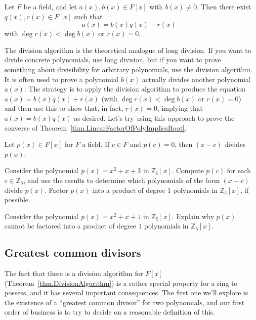 \begin{theorem}\label{thm.DivisionAlgorithm}
Let $F$ be a field, and let $a(x),b(x)\in F[x]$ with $b(x) \neq 0$. Then there exist $q(x),r(x)\in F[x]$ such that 
\[a(x) = b(x)q(x) + r(x)\]
with $\deg r(x) < \deg b(x)$ or $r(x) = 0$.
\end{theorem}

The division algorithm is the theoretical analogue of long division. If you want to divide concrete polynomials, use long division, but if you want to prove something about divisibility for arbitrary polynomials, use the division algorithm. It is often used to prove a polynomial $b(x)$ actually divides another polynomial $a(x)$. The strategy is to apply the division algorithm to produce the equation $a(x) = b(x)q(x) + r(x)$ (with $\deg r(x) < \deg b(x)$ or $r(x) = 0$) and then use this to show that, in fact, $r(x)=0$,  implying that $a(x) = b(x)q(x)$ as desired. Let's try using this approach to prove the converse of Theorem~\ref{thm.LinearFactorOfPolyImpliesRoot}.

\begin{theorem}\label{thm.RootImpliesLinearFactorOfPoly}
Let $p(x)\in F[x]$ for $F$ a field. If $c\in F$ and $p(c) = 0$, then $(x-c)$ divides $p(x)$.
\end{theorem}

\begin{problem}
Consider the polynomial  $p(x) = x^2+x+3$ in $\mathbb{Z}_5[x]$. Compute $p(c)$ for each $c\in \mathbb{Z}_5$, and use the results to determine which polynomials of the form $(x-c)$ divide $p(x)$. Factor $p(x)$ into a product of degree $1$ polynomials in $\mathbb{Z}_5[x]$, if possible.
\end{problem}

\begin{problem}
Consider the polynomial  $p(x) = x^2+x+1$ in $\mathbb{Z}_5[x]$. Explain why $p(x)$ cannot be factored into a product of degree $1$ polynomials in $\mathbb{Z}_5[x]$.
\end{problem}

\subsection{Greatest common divisors}

The fact that there is a division algorithm for $F[x]$ (Theorem~\ref{thm.DivisionAlgorithm}) is a rather special property for a ring to possess, and it has several important consequences. The first one we'll explore is the existence of a ``greatest common divisor'' for two polynomials, and our first order of business is to try to decide on a reasonable definition of this.
 
